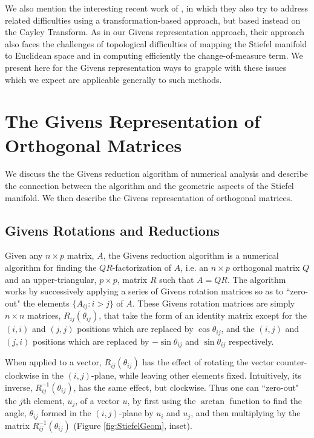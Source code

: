 \documentclass[ba]{imsart}
\numberwithin{equation}{section}
\theoremstyle{plain}
\begin{document}
\noindent We also mention the interesting recent work of \cite{jauch2018random}, in which they also try to address related difficulties using a transformation-based approach, but based instead on the Cayley Transform.  As in our Givens representation approach, their approach also faces the challenges of topological difficulties of mapping the Stiefel manifold to Euclidean space and in computing efficiently the change-of-measure term. We present here for the Givens representation ways to grapple with these issues which we expect are applicable generally to such methods.

\section{The Givens Representation of Orthogonal Matrices} \label{Givens}
We discuss the the Givens reduction algorithm of numerical analysis and describe the connection between the algorithm and the geometric aspects of the Stiefel manifold. We then describe the Givens representation of orthogonal matrices.

\subsection{Givens Rotations and Reductions} \label{givens_reduction}
Given any $n \times p$ matrix, $A$, the Givens reduction algorithm is a numerical algorithm for finding the $QR$-factorization of $A$, i.e. an $n\times p$ orthogonal matrix $Q$ and an upper-triangular, $p \times p$, matrix $R$ such that $A = QR$. The algorithm works by successively applying a series of Givens rotation matrices so as to ``zero-out" the elements $\{A_{ij} : i > j \}$ of $A$. These Givens rotation matrices are simply $n \times n$ matrices, $R_{ij}(\theta_{ij})$, that take the form of an identity matrix except for the $(i,i)$ and $(j,j)$ positions which are replaced by $\cos \theta_{ij}$, and the $(i,j)$ and $(j,i)$ positions which are replaced by $-\sin \theta_{ij}$ and $\sin \theta_{ij}$ respectively.

\noindent When applied to a vector, $R_{ij}(\theta_{ij})$ has the effect of rotating the vector counter-clockwise in the $(i,j)$-plane, while leaving other elements fixed. Intuitively, its inverse, $R_{ij}^{-1}(\theta_{ij})$, has the same effect, but clockwise. Thus one can ``zero-out" the $j$th element, $u_j$, of a vector $u$, by first using the $\arctan$ function to find the angle, $\theta_{ij}$ formed in the $(i,j)$-plane by $u_i$ and $u_j$, and then multiplying by the matrix $R_{ij}^{-1}(\theta_{ij})$ (Figure \ref{fig:StiefelGeom}, inset).
\end{document}
